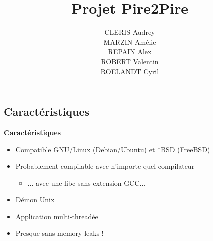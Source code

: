\documentclass{beamer}
\begin{document}
\title{Projet Pire2Pire}
\author {
CLERIS Audrey        \\
MARZIN Amélie        \\
REPAIN Alex          \\
ROBERT Valentin      \\
ROELANDT Cyril
}


\begin{frame}
    \titlepage
\end{frame}

\begin{frame}
    \section{Caractéristiques}

    \textbf{Caractéristiques}
    \begin{itemize}
        \item Compatible GNU/Linux (Debian/Ubuntu) et *BSD (FreeBSD)
        \item Probablement compilable avec n'importe quel compilateur
        \begin{itemize}
            \item ... avec une libc sans extension GCC...
        \end{itemize}
        \item Démon Unix
        \item Application multi-threadée
        \item Presque sans memory leaks !
    \end{itemize}
\end{frame}
\end{document}
